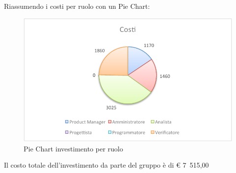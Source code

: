 				Riassumendo i costi per ruolo con un Pie Chart:
				\begin{figure}[H]\centering
					\includegraphics[width=\textwidth]{PianoDiProgetto/Pics/ChartTotCostiInvest.pdf}
					\caption{Pie Chart investimento per ruolo}
				\end{figure}
				Il costo totale dell'investimento da parte del gruppo è di \euro{} 7~515,00 